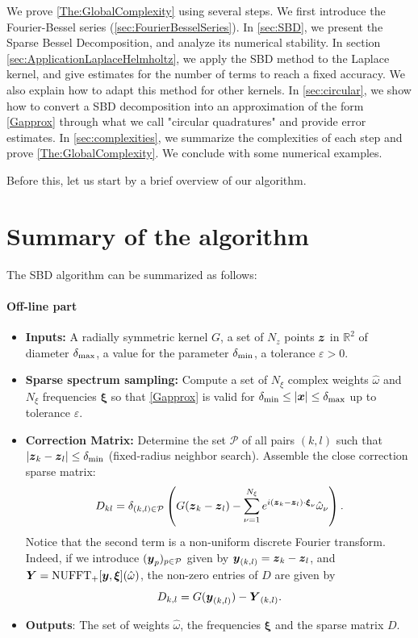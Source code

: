 \documentclass[smallextended]{svjour3}
\begin{document}
We prove \autoref{The:GlobalComplexity} using several steps. We first introduce the Fourier-Bessel series (\autoref{sec:FourierBesselSeries}). In \autoref{sec:SBD}, we present the Sparse Bessel Decomposition, and analyze its numerical stability. In section \autoref{sec:ApplicationLaplaceHelmholtz}, we apply the SBD method to the Laplace kernel, and give estimates for the number of terms to reach a fixed accuracy. We also explain how to adapt this method for other kernels. In \autoref{sec:circular}, we show how to convert a SBD decomposition into an approximation of the form \eqref{Gapprox} through what we call "circular quadratures" and provide error estimates. In \autoref{sec:complexities}, we summarize the complexities of each step and prove \autoref{The:GlobalComplexity}. We conclude with some numerical examples. 

Before this, let us start by a brief overview of our algorithm.


\section{Summary of the algorithm}
\setcounter{equation}{0}
\label{sec:overview}

The SBD algorithm can be summarized as follows:
\paragraph{Off-line part}
\begin{itemize}
	\item[]\textbf{Inputs:} A radially symmetric kernel $G$, a set of $N_z$ points $\boldsymbol{z}$ in $\mathbb{R}^2$ of diameter $\delta_{\max}$, a value for the parameter $\delta_{\min}$, a tolerance $\varepsilon > 0$.
	\item[]\textbf{Sparse spectrum sampling:} Compute a set of $N_\xi$ complex weights $\hat{\omega}$ and $N_\xi$ frequencies $\boldsymbol{\xi}$ so that \eqref{Gapprox} is valid for $\delta_{\min} \leq |\boldsymbol{x}| \leq \delta_{\max}$ up to tolerance $\varepsilon$. 
	\item[]\textbf{Correction Matrix:} Determine the set $\mathcal{P}$ of all pairs $(k,l)$ such that $\left\lvert \boldsymbol{z}_k - \boldsymbol{z}_l \right\rvert \leq \delta_{\min}$ (fixed-radius neighbor search). Assemble the close correction sparse matrix:
	      \begin{equation}
	      	\label{defD}
	      	D_{kl} = \delta_{(k,l) \in \mathcal{P}} \left( G({\boldsymbol{z}_k - \boldsymbol{z}_l}) - \sum_{\nu = 1}^{N_{\xi}}e^{i (\boldsymbol{z}_k - \boldsymbol{z}_l)\cdot \boldsymbol{\xi}_\nu} \hat{\omega}_\nu\right).
	      \end{equation}
	      Notice that the second term is a non-uniform discrete Fourier transform. Indeed, if we introduce $(\boldsymbol{y}_p)_{p \in \mathcal{P}}$ given by 
	      $\boldsymbol{y}_{(k,l)} = \boldsymbol{z}_k - \boldsymbol{z}_l$, and $\boldsymbol{Y} = \textup{NUFFT}_+[\boldsymbol{y},\boldsymbol{\xi}](\hat{\omega})$, the non-zero entries of $D$ are given by
	      \[ D_{k,l} = G(\boldsymbol{y}_{(k,l)}) - \boldsymbol{Y}_{(k,l)}.\]
	\item[] \textbf{Outputs}: The set of weights $\hat{\omega}$, the frequencies $\boldsymbol{\xi}$ and the sparse matrix $D$. 
\end{itemize}
\end{document}
